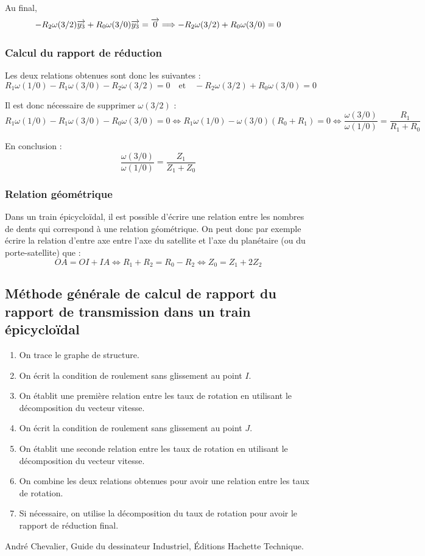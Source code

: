 \documentclass[10pt,oneside]{article}
\begin{document}
\vspace{.25cm}

Au final, 
$$
-R_2 \omega(3/2)\overrightarrow{y_3} + R_0 \omega(3/0)\overrightarrow{y_3}= \overrightarrow{0}
\Longrightarrow 
-R_2 \omega(3/2) + R_0 \omega(3/0)= 0
$$

\subsubsection{Calcul du rapport de réduction}
Les deux relations obtenues sont donc les suivantes : 
$$
R_1 \omega(1/0) -R_1 \omega(3/0)  -R_2 \omega(3/2) = 0 
\quad \text{et} \quad
-R_2 \omega(3/2) + R_0 \omega(3/0)= 0
$$

Il est donc nécessaire de supprimer $\omega(3/2)$ :
$$
R_1 \omega(1/0) -R_1 \omega(3/0) -  R_0 \omega(3/0) = 0 
\Longleftrightarrow
R_1 \omega(1/0) - \omega(3/0) \left(R_0 +R_1 \right) = 0 
\Longleftrightarrow
\dfrac{\omega(3/0)}{\omega(1/0)} = \dfrac{R_1}{R_1 +R_0}
$$

En conclusion :
$$
\dfrac{\omega(3/0)}{\omega(1/0)} = \dfrac{Z_1}{Z_1 +Z_0}
$$

\subsubsection{Relation géométrique}

Dans un train épicycloïdal, il est possible d'écrire une relation entre les nombres de dents qui correspond à une relation géométrique. On peut donc par exemple écrire la relation d'entre axe entre l'axe du satellite et l'axe du planétaire (ou du porte-satellite) que :
$$
OA = OI + IA \Longleftrightarrow 
R_1 + R_2 = R_0 - R_2
\Longleftrightarrow 
Z_0 = Z_1 + 2Z_2
$$

\subsection{Méthode générale de calcul de rapport du rapport de transmission dans un train épicycloïdal}

\begin{methode}
\begin{enumerate}
\item On trace le graphe de structure.
\item On écrit la condition de roulement sans glissement au point $I$. 
\item On établit une première relation entre les taux de rotation en utilisant le décomposition du vecteur vitesse.
\item On écrit la condition de roulement sans glissement au point $J$.
\item On établit une seconde relation  entre les taux de rotation en utilisant le décomposition du vecteur vitesse.
\item On combine les deux relations obtenues pour avoir une relation entre les taux de rotation.
\item Si nécessaire, on utilise la décomposition du taux de rotation pour avoir le rapport de réduction final.
\end{enumerate}
\end{methode}


\begin{thebibliography}{2}
 André Chevalier, Guide du dessinateur Industriel, Éditions Hachette Technique.
\end{thebibliography}
\end{document}
